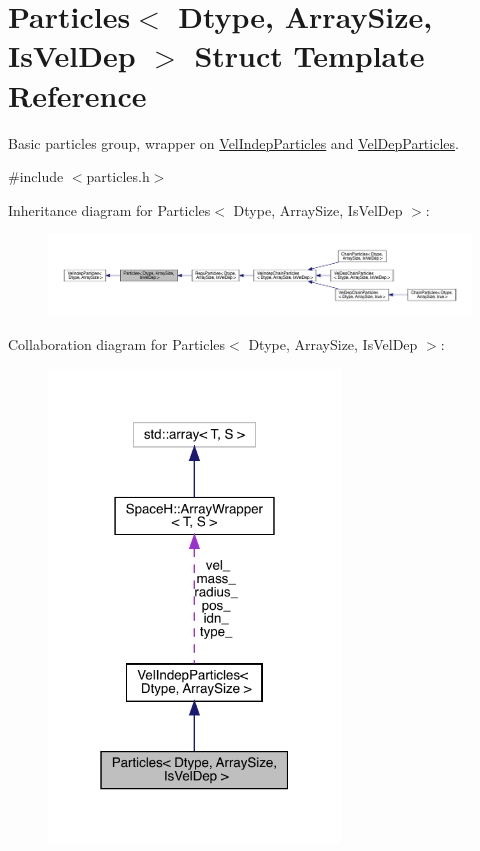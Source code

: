 \hypertarget{struct_particles}{}\section{Particles$<$ Dtype, Array\+Size, Is\+Vel\+Dep $>$ Struct Template Reference}
\label{struct_particles}


Basic particles group, wrapper on \mbox{\hyperlink{class_vel_indep_particles}{Vel\+Indep\+Particles}} and \mbox{\hyperlink{class_vel_dep_particles}{Vel\+Dep\+Particles}}.  




{\ttfamily \#include $<$particles.\+h$>$}



Inheritance diagram for Particles$<$ Dtype, Array\+Size, Is\+Vel\+Dep $>$\+:\nopagebreak
\begin{figure}[H]
\begin{center}
\leavevmode
\includegraphics[width=350pt]{struct_particles__inherit__graph}
\end{center}
\end{figure}


Collaboration diagram for Particles$<$ Dtype, Array\+Size, Is\+Vel\+Dep $>$\+:\nopagebreak
\begin{figure}[H]
\begin{center}
\leavevmode
\includegraphics[width=220pt]{struct_particles__coll__graph}
\end{center}
\end{figure}
